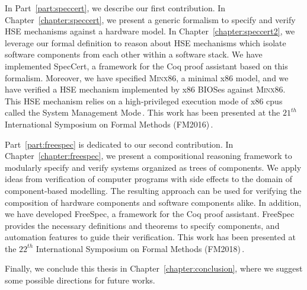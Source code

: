 In Part~\ref{part:speccert}, we describe our first contribution.
%
In Chapter~\ref{chapter:speccert}, we present a generic formalism to specify and
verify HSE mechanisms against a hardware model.
%
In Chapter~\ref{chapter:speccert2}, we leverage our formal definition to reason
about HSE mechanisms which isolate software components from each other within a
software stack.
%
We have implemented SpecCert, a framework for the Coq proof assistant based on
this formalism.
%
Moreover, we have specified {\scshape Minx86}, a minimal x86 model, and we
have verified a HSE mechanism implemented by x86 BIOSes against {\scshape
  Minx86}.
%
This HSE mechanism relies on a high-privileged execution mode of x86 \acp{cpu}
called the System Management Mode\,\cite{intel2014manual}.
%
This work has been presented at the $21^{th}$ International Symposium on Formal
Methods (FM2016)\,\cite{letan2016speccert}.

Part~\ref{part:freespec} is dedicated to our second contribution.
%
In Chapter~\ref{chapter:freespec}, we present a compositional reasoning
framework to modularly specify and verify systems organized as trees of
components.
%
We apply ideas from verification of computer programs with side effects to the
domain of component-based modelling. The resulting approach can be used for
verifying the composition of hardware components and software components alike.
%
In addition, we have developed FreeSpec, a framework for the Coq proof
assistant.
%
FreeSpec provides the necessary definitions and theorems to specify components,
and automation features to guide their verification.
%
This work has been presented at the $22^{th}$ International Symposium on Formal
Methods (FM2018)\,\cite{letan2018freespec}.

Finally, we conclude this thesis in Chapter~\ref{chapter:conclusion}, where we
suggest some possible directions for future works.
